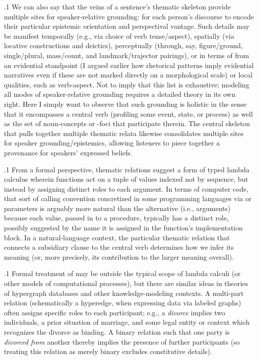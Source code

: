\documentclass[11pt, twocolumn]{article}
\begin{document}
\p.1{%
We can also say that the veins of a sentence's thematic skeleton
provide multiple sites for speaker-relative grounding: for
each person's discourse to encode their particular epistemic
orientation and perspectival vantage.  Such details may
be manifest temporally (e.g., via choice of verb tense/aspect),
spatially (via locative constructions and deictics), perceptually
(through, say, figure/ground, single/plural,
mass/count, and landmark/trajector pairings),
or in terms of  from an evidential
standpoint (I argued earlier how rhetorical patterns
imply evidential narratives even if these are not marked
directly on a morphological scale) or local qualities, such as
verb-aspect.  Not to imply that this list is exhaustive;
modeling all modes of speaker-relative grounding requires a detailed
theory in its own right.  Here I simply want to observe that
such grounding is holistic in the sense that it encompasses
a central verb (profiling some event, state, or process) as well as
the set of noun-concepts or -foci that participate therein.
The central skeleton that pulls together multiple thematic
relata likewise consolidates multiple sites for speaker
grounding/epistemics, allowing listeners to piece together
a provenance for speakers' expressed beliefs.
} %

\p.1{%
From a formal perspective, thematic relations suggest a
form of typed lambda calculus wherein functions act on a
tuple of values indexed not by sequence, but instead by
assigning distinct roles to each argument.
In terms of computer code, that sort of calling convention
\mdash{} concretized in some programming languages via
 or  parameters \mdash{} is arguably
more natural than the alternative (i.e., 
arguments) because each value, passed in to a procedure,
typically has a distinct role, possibly suggested by the
name it is assigned in the function's implementation
block.  In a natural-language context, the particular
thematic relation that connects a subsidiary clause to the
central verb determines how we infer its meaning
(or, more precisely, its contribution to the larger meaning overall).
} %

\p.1{%
Formal treatment of  may be outside the typical
scope of lambda calculi (or other models of computational
processes), but there are similar ideas in theories of
hypergraph databases and other knowledge-modeling contexts.
A multi-part relation (schematically a hyperedge, when
expressing data via labeled graphs) often assigns specific roles
to each participant; e.g., a \textit{divorce} implies two individuals,
a prior situation of marriage, and some legal entity or
context which recognizes the divorce as binding.
A binary relation such that one party is \textit{divorced from}
another thereby implies the presence of further participants
(so treating this relation as merely binary excludes constitutive
details).
} %
\end{document}
